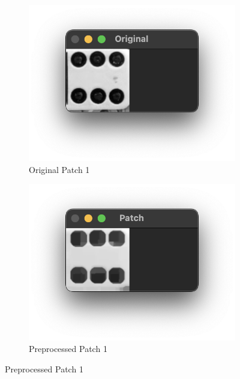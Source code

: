 \documentclass[12pt]{article}
\begin{document}
    \begin{figure}[!h]
        \centering
        \label{fig:patch-preprocessing}
        \begin{subfigure}{.5\textwidth}
            \centering
            \includegraphics[width=0.9\linewidth]{images/patch_preprocessing/original1.png}
            \caption{Original Patch 1}
            \label{fig:op-1}
        \end{subfigure}%
        \begin{subfigure}{.5\textwidth}
            \centering
            \includegraphics[width=0.9\linewidth]
            {images/patch_preprocessing/preproc1.png}
            \caption{Preprocessed Patch 1}
            \label{fig:pp-1}
        \end{subfigure}
    \end{figure}
\end{document}
